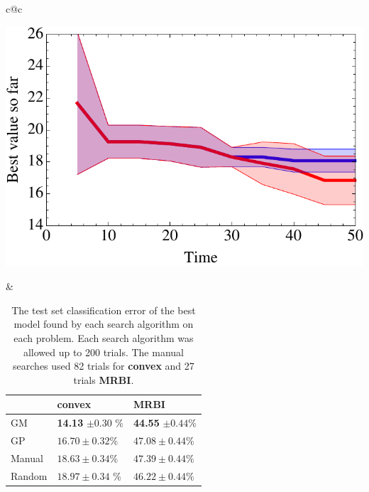 \documentclass{article}
\newcommand{\vs}[1]{\vspace*{-#1mm}}
\begin{document}
\begin{table}[t]
\vs{2}
\begin{center}
\begin{tabular}{c@{}c}
\begin{minipage}{0.43\linewidth}
\begin{center}
\includegraphics[scale=.39]{../nips2011paper/figures/bostonHousing.pdf}
\vs{3}
\end{center}
\end{minipage}
&
\hspace*{6mm}\begin{minipage}{0.45\linewidth}
    \begin{center}
    \begin{tabular}{lll}
                & {\bf convex} & {\bf MRBI} \\
        \hline
        GM & {\bf 14.13} $ \pm 0.30$ \% & {\bf 44.55} $ \pm 0.44$\%   \\
        GP & $ 16.70 \pm 0.32$\% &  $ 47.08\pm 0.44 $\% \\
        Manual & $18.63 \pm 0.34$\%  &  $47.39 \pm 0.44$\%  \\
        Random &  $ 18.97\pm 0.34$ \%  & $46.22 \pm 0.44$\% \\
        \hline
    \end{tabular}
    \end{center}
    \caption{The test set classification error of the best model
    found by each search algorithm on each problem.
    Each search algorithm was allowed up to 200 trials.
    The manual searches used 82 trials for {\bf convex}
    and 27 trials {\bf MRBI}.
    \label{tbl:testerr}
    }
\end{minipage}
\end{tabular}
\end{center}
\vs{6}
\end{table}
\end{document}
